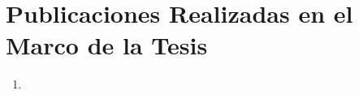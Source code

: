 \chapter{Publicaciones Realizadas en el Marco de la Tesis}
\label{anexo:publicaciones_de_tesis}

\begin{enumerate}
	\item {}
\end{enumerate}
